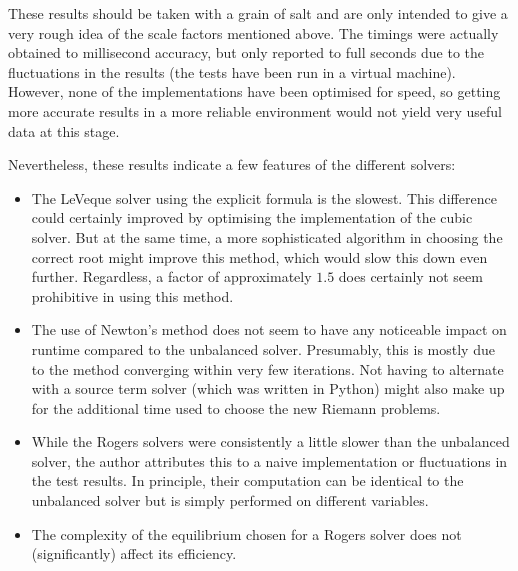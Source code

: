 These results should be taken with a grain of salt and are only intended to give a very rough idea of the scale factors mentioned above. The timings were actually obtained to millisecond accuracy, but only reported to full seconds due to the fluctuations in the results (the tests have been run in a virtual machine). However, none of the implementations have been optimised for speed, so getting more accurate results in a more reliable environment would not yield very useful data at this stage.

Nevertheless, these results indicate a few features of the different solvers:

\begin{itemize}
  \item The LeVeque solver using the explicit formula is the slowest. This difference could certainly improved by optimising the implementation of the cubic solver. But at the same time, a more sophisticated algorithm in choosing the correct root might improve this method, which would slow this down even further. Regardless, a factor of approximately $1.5$ does certainly not seem prohibitive in using this method.
  \item The use of Newton's method does not seem to have any noticeable impact on runtime compared to the unbalanced solver. Presumably, this is mostly due to the method converging within very few iterations. Not having to alternate with a source term solver (which was written in Python) might also make up for the additional time used to choose the new Riemann problems.
  \item While the Rogers solvers were consistently a little slower than the unbalanced solver, the author attributes this to a naive implementation or fluctuations in the test results. In principle, their computation can be identical to the unbalanced solver but is simply performed on different variables.
  \item The complexity of the equilibrium chosen for a Rogers solver does not (significantly) affect its efficiency.
\end{itemize}